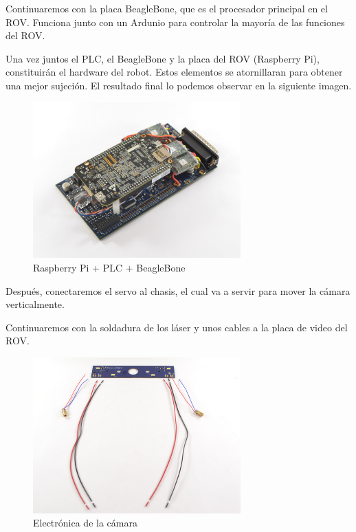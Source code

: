 Continuaremos con la placa BeagleBone, que es el procesador principal en el ROV. Funciona junto con un Ardunio para controlar la mayoría de las funciones del ROV.

Una vez juntos el PLC, el BeagleBone y la placa del ROV (Raspberry Pi), constituirán el hardware del robot. Estos elementos se atornillaran para obtener una mejor sujeción. El resultado final lo podemos observar en la siguiente imagen.

\begin{figure} [hbtp]
  \begin{center}
    \includegraphics[width=8cm]{img/cap3/3_3/electronica}
  \end{center}
  \caption{Raspberry Pi + PLC + BeagleBone}
  \label{fig:electronica}
\end{figure}

Después, conectaremos el servo al chasis, el cual va a servir para mover la cámara verticalmente.

Continuaremos con la soldadura de los láser y unos cables a la placa de video del ROV.

\begin{figure} [hbtp]
  \begin{center}
    \includegraphics[width=8cm]{img/cap3/3_3/electronica_camara}
  \end{center}
  \caption{Electrónica de la cámara}
  \label{fig:electronica_camara}
\end{figure}

